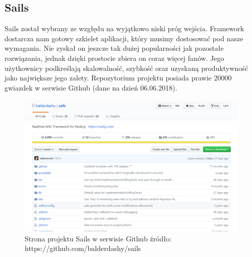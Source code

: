 \documentclass[12pt]{report}
\begin{document}
    \subsection{Sails}
      Sails został wybrany ze wzgłędu na wyjątkowo niski próg wejścia.
      Framework dostarcza nam gotowy szkielet aplikacji, który musimy dostosować pod nasze wymagania.
      Nie zyskał on jeszcze tak dużej popularności jak pozostałe rozwiązania, jednak dzięki prostocie zbiera on coraz więcej fanów.
      Jego użytkownicy podkreślają skalowalność, szybkość oraz uzyskaną produktywność jako największe jego zalety.
      Repozytorium projektu posiada prawie 20000 gwiazdek w serwisie Github (dane na dzień 06.06.2018).
      \begin{figure}[!hb]
        \centering
        \includegraphics[width=\textwidth,height=\textheight,keepaspectratio]{sails.png} 
        \caption{Strona projektu Sails w serwisie Github \newline źródło: https://github.com/balderdashy/sails}
      \end{figure}
\end{document}

